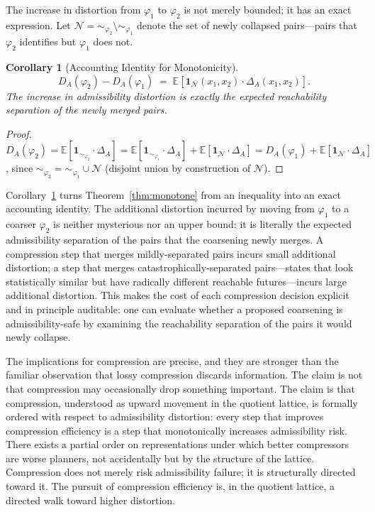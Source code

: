 \documentclass[11pt, a4paper]{article}
\theoremstyle{plain}
\newtheorem{corollary}{Corollary}
\theoremstyle{definition}
\theoremstyle{remark}
\begin{document}
The increase in distortion from $\varphi_1$ to $\varphi_2$ is not merely bounded;
it has an exact expression. Let $\mathcal{N} = {\sim_{\varphi_2}} \setminus
{\sim_{\varphi_1}}$ denote the set of newly collapsed pairs---pairs that
$\varphi_2$ identifies but $\varphi_1$ does not.

\begin{corollary}[Accounting Identity for Monotonicity]
\label{cor:accounting}
\begin{equation}
  D_A(\varphi_2) - D_A(\varphi_1)
  \;=\;
  \mathbb{E}\!\left[
    \mathbf{1}_{\mathcal{N}}(x_1, x_2)
    \cdot \Delta_A(x_1, x_2)
  \right].
\end{equation}
The increase in admissibility distortion is exactly the expected reachability
separation of the newly merged pairs.
\end{corollary}

\begin{proof}
$D_A(\varphi_2) = \mathbb{E}[\mathbf{1}_{\sim_{\varphi_2}} \cdot \Delta_A]
= \mathbb{E}[\mathbf{1}_{\sim_{\varphi_1}} \cdot \Delta_A]
+ \mathbb{E}[\mathbf{1}_{\mathcal{N}} \cdot \Delta_A]
= D_A(\varphi_1) + \mathbb{E}[\mathbf{1}_{\mathcal{N}} \cdot \Delta_A]$,
since ${\sim_{\varphi_2}} = {\sim_{\varphi_1}} \cup \mathcal{N}$ (disjoint union
by construction of $\mathcal{N}$).
\end{proof}

Corollary~\ref{cor:accounting} turns Theorem~\ref{thm:monotone} from an
inequality into an exact accounting identity. The additional distortion incurred
by moving from $\varphi_1$ to a coarser $\varphi_2$ is neither mysterious nor
an upper bound: it is literally the expected admissibility separation of the
pairs that the coarsening newly merges. A compression step that merges
mildly-separated pairs incurs small additional distortion; a step that merges
catastrophically-separated pairs---states that look statistically similar but
have radically different reachable futures---incurs large additional distortion.
This makes the cost of each compression decision explicit and in principle
auditable: one can evaluate whether a proposed coarsening is admissibility-safe
by examining the reachability separation of the pairs it would newly collapse.

The implications for compression are precise, and they are stronger than the
familiar observation that lossy compression discards information. The claim is
not that compression may occasionally drop something important. The claim is
that compression, understood as upward movement in the quotient lattice, is
formally ordered with respect to admissibility distortion: every step that
improves compression efficiency is a step that monotonically increases
admissibility risk. There exists a partial order on representations under which
better compressors are worse planners, not accidentally but by the structure of
the lattice. Compression does not merely risk admissibility failure; it is
structurally directed toward it. The pursuit of compression efficiency is, in
the quotient lattice, a directed walk toward higher distortion.
\end{document}
